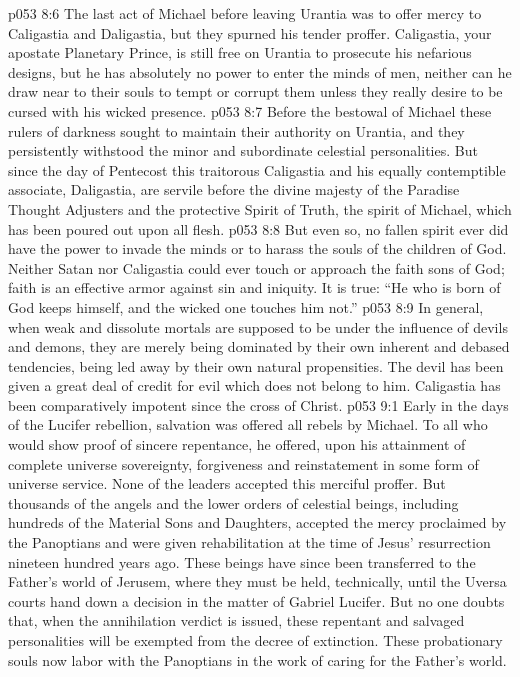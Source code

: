\vs p053 8:6 \pc The last act of Michael before leaving Urantia was to offer mercy to Caligastia and Daligastia, but they spurned his tender proffer. Caligastia, your apostate Planetary Prince, is still free on Urantia to prosecute his nefarious designs, but he has absolutely no power to enter the minds of men, neither can he draw near to their souls to tempt or corrupt them unless they really desire to be cursed with his wicked presence.
\vs p053 8:7 \pc Before the bestowal of Michael these rulers of darkness sought to maintain their authority on Urantia, and they persistently withstood the minor and subordinate celestial personalities. But since the day of Pentecost this traitorous Caligastia and his equally contemptible associate, Daligastia, are servile before the divine majesty of the Paradise Thought Adjusters and the protective Spirit of Truth, the spirit of Michael, which has been poured out upon all flesh.
\vs p053 8:8 But even so, no fallen spirit ever did have the power to invade the minds or to harass the souls of the children of God. Neither Satan nor Caligastia could ever touch or approach the faith sons of God; faith is an effective armor against sin and iniquity. It is true: “He who is born of God keeps himself, and the wicked one touches him not.”
\vs p053 8:9 In general, when weak and dissolute mortals are supposed to be under the influence of devils and demons, they are merely being dominated by their own inherent and debased tendencies, being led away by their own natural propensities. The devil has been given a great deal of credit for evil which does not belong to him. Caligastia has been comparatively impotent since the cross of Christ.
\vs p053 9:1 Early in the days of the Lucifer rebellion, salvation was offered all rebels by Michael. To all who would show proof of sincere repentance, he offered, upon his attainment of complete universe sovereignty, forgiveness and reinstatement in some form of universe service. None of the leaders accepted this merciful proffer. But thousands of the angels and the lower orders of celestial beings, including hundreds of the Material Sons and Daughters, accepted the mercy proclaimed by the Panoptians and were given rehabilitation at the time of Jesus’ resurrection nineteen hundred years ago. These beings have since been transferred to the Father’s world of Jerusem, where they must be held, technically, until the Uversa courts hand down a decision in the matter of Gabriel  Lucifer. But no one doubts that, when the annihilation verdict is issued, these repentant and salvaged personalities will be exempted from the decree of extinction. These probationary souls now labor with the Panoptians in the work of caring for the Father’s world.
